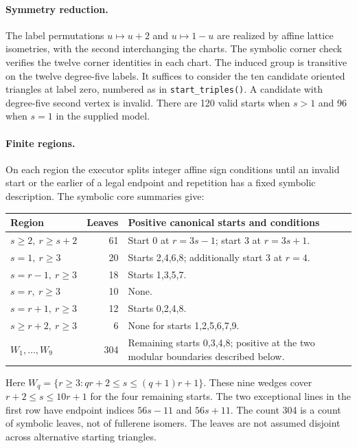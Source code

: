 \documentclass[11pt]{amsart}
\newcommand{\record}[1]{\nolinkurl{#1}}
\newcommand{\claimid}[1]{}
\theoremstyle{definition}\newtheorem{definition}[theorem]{Definition}
\begin{document}
\paragraph{Symmetry reduction.}\label{lem:symmetry}
The label permutations $u\mapsto u+2$ and $u\mapsto1-u$ are realized
by affine lattice isometries, with the second interchanging the charts.
The symbolic corner check verifies the twelve corner identities in
each chart. The induced group is transitive on the twelve degree-five
labels. It suffices to consider the ten candidate oriented triangles
at label zero, numbered as in \record{start_triples()}. A candidate
with degree-five second vertex is invalid. There are 120 valid starts
when $s>1$ and 96 when $s=1$ in the supplied model.
\claimid{lem:symmetry}

\paragraph{Finite regions.}\label{prop:regions}
On each region the executor splits integer affine sign conditions until
an invalid start or the earlier of a legal endpoint and repetition has
a fixed symbolic description. The symbolic core summaries give:
\claimid{prop:regions}
\begin{center}\small
\begin{tabular}{p{.25\linewidth}r p{.57\linewidth}}
\toprule
Region & Leaves & Positive canonical starts and conditions\\\midrule
$s\ge2,\ r\ge s+2$ &61& Start 0 at $r=3s-1$; start 3 at $r=3s+1$.\\
$s=1,\ r\ge3$ &20& Starts 2,4,6,8; additionally start 3 at $r=4$.\\
$s=r-1,\ r\ge3$ &18& Starts 1,3,5,7.\\
$s=r,\ r\ge3$ &10& None.\\
$s=r+1,\ r\ge3$ &12& Starts 0,2,4,8.\\
$s\ge r+2,\ r\ge3$ &6& None for starts 1,2,5,6,7,9.\\
$W_1,\ldots,W_9$ &304& Remaining starts 0,3,4,8; positive at the two modular boundaries described below.\\\bottomrule
\end{tabular}
\end{center}
Here $W_q=\{r\ge3:qr+2\le s\le(q+1)r+1\}$. These nine wedges cover
$r+2\le s\le10r+1$ for the four remaining starts. The two exceptional
lines in the first row have endpoint indices $56s-11$ and $56s+11$.
The count 304 is a count of symbolic leaves, not of fullerene isomers.
The leaves are not assumed disjoint across alternative starting triangles.
\end{document}

